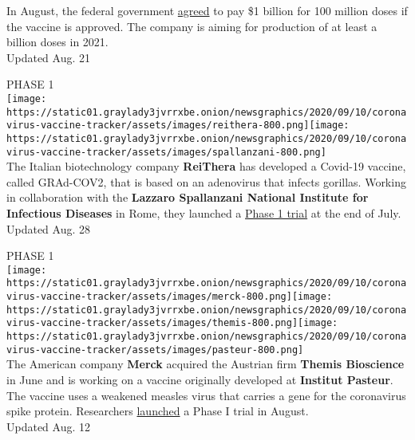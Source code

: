 In August, the federal government
\href{https://www.jnj.com/johnson-johnson-announces-agreement-with-u-s-government-for-100-million-doses-of-investigational-covid-19-vaccine}{agreed}
to pay \$1 billion for 100 million doses if the vaccine is approved. The
company is aiming for production of at least a billion doses in 2021.\\
Updated Aug. 21

PHASE 1\\
\texttt{[image: https://static01.graylady3jvrrxbe.onion/newsgraphics/2020/09/10/coronavirus-vaccine-tracker/assets/images/reithera-800.png]}\texttt{[image: https://static01.graylady3jvrrxbe.onion/newsgraphics/2020/09/10/coronavirus-vaccine-tracker/assets/images/spallanzani-800.png]}\\
The Italian biotechnology company \textbf{\textbf{ReiThera}} has
developed a Covid-19 vaccine, called GRAd-COV2, that is based on an
adenovirus that infects gorillas. Working in collaboration with the
\textbf{\textbf{Lazzaro Spallanzani National Institute for Infectious
Diseases}} in Rome, they launched a
\href{https://clinicaltrials.gov/ct2/show/NCT04528641?term=vaccine\&recrs=adf\&cond=COVID-19\&phase=0123\&sort=nwst\&draw=2\&rank=2}{Phase
1 trial} at the end of July.\\
Updated Aug. 28

PHASE 1\\
\texttt{[image: https://static01.graylady3jvrrxbe.onion/newsgraphics/2020/09/10/coronavirus-vaccine-tracker/assets/images/merck-800.png]}\texttt{[image: https://static01.graylady3jvrrxbe.onion/newsgraphics/2020/09/10/coronavirus-vaccine-tracker/assets/images/themis-800.png]}\texttt{[image: https://static01.graylady3jvrrxbe.onion/newsgraphics/2020/09/10/coronavirus-vaccine-tracker/assets/images/pasteur-800.png]}\\
The American company \textbf{\textbf{Merck}} acquired the Austrian firm
\textbf{\textbf{Themis Bioscience}} in June and is working on a vaccine
originally developed at \textbf{\textbf{Institut Pasteur}}. The vaccine
uses a weakened measles virus that carries a gene for the coronavirus
spike protein. Researchers
\href{https://clinicaltrials.gov/ct2/show/NCT04497298?term=vaccine\&cond=covid-19\&draw=2\&rank=1}{launched}
a Phase I trial in August.\\
Updated Aug. 12


